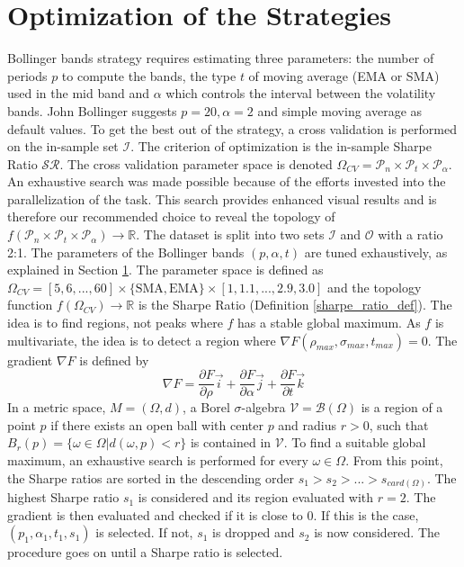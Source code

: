 \documentclass[11pt,a4,twosided,singlespacing,titlepagenumber=on]{scrreprt}
\numberwithin{equation}{chapter} %
\theoremstyle{remark}
\begin{document}
\section{Optimization of the Strategies}
\label{sec:optimization_strategy}
Bollinger bands strategy requires estimating three parameters: the number of periods $p$ to compute the bands, the type $t$ of moving average (EMA or SMA) used in the mid band and $\alpha$ which controls the interval between the volatility bands. John Bollinger suggests $p = 20, \alpha = 2$ and simple moving average as default values. To get the best out of the strategy, a cross validation is performed on the in-sample set $\mathcal{I}$. The criterion of optimization is the in-sample Sharpe Ratio $\mathcal{SR}$. The cross validation parameter space is denoted  $\Omega_{CV} = \mathcal{P}_n \times \mathcal{P}_t \times \mathcal{P}_\alpha$. An exhaustive search was made possible because of the efforts invested into the parallelization of the task. This search provides enhanced visual results and is therefore our recommended choice to reveal the topology of $f(\mathcal{P}_n \times \mathcal{P}_t \times \mathcal{P}_\alpha) \rightarrow \mathbb{R}$. The dataset is split into two sets $\mathcal{I}$ and $\mathcal{O}$ with a ratio 2:1. The parameters of the Bollinger bands $(p, \alpha, t)$ are tuned exhaustively, as explained in Section \ref{sec:optimization_strategy}. The parameter space is defined as $\Omega_{CV}  = [5,6,...,60] \times \{\text{SMA}, \text{EMA}\} \times [1,1.1,...,2.9,3.0]$ and the topology function $f(\Omega_{CV}) \rightarrow \mathbb{R}$ is the Sharpe Ratio (Definition \ref{sharpe_ratio_def}). The idea is to find regions, not peaks where $f$ has a stable global maximum. As $f$ is multivariate, the idea is to detect a region where $\nabla F(\rho_{max}, \sigma_{max}, t_{max}) = 0$. The gradient $\nabla F$ is defined by
\begin{equation}
\nabla F = \frac{\partial F}{\partial \rho} \vec{i} + \frac{\partial F}{\partial \alpha} \vec{j} + \frac{\partial F}{\partial t} \vec{k}
\end{equation}
In a metric space, $M = (\Omega, d)$, a Borel $\sigma$-algebra $\mathcal{V} = \mathcal{B}(\Omega)$ is a region of a point $p$ if there exists an open ball with center $p$ and radius $r > 0$, such that $B_r(p) = \{\omega \in \Omega | d(\omega, p) < r\}$ is contained in $\mathcal{V}$. To find a suitable global maximum, an exhaustive search is performed for every $\omega \in \Omega$. From this point, the Sharpe ratios are sorted in the descending order $s_1 > s_2 > ... > s_{card(\Omega)}$. The highest Sharpe ratio $s_1$ is considered and its region evaluated with $r=2$. The gradient is then evaluated and checked if it is close to 0. If this is the case, $(p_1, \alpha_1, t_1, s_1)$ is selected. If not, $s_1$ is dropped and $s_2$ is now considered. The procedure goes on until a Sharpe ratio is selected.
 
\end{document}
